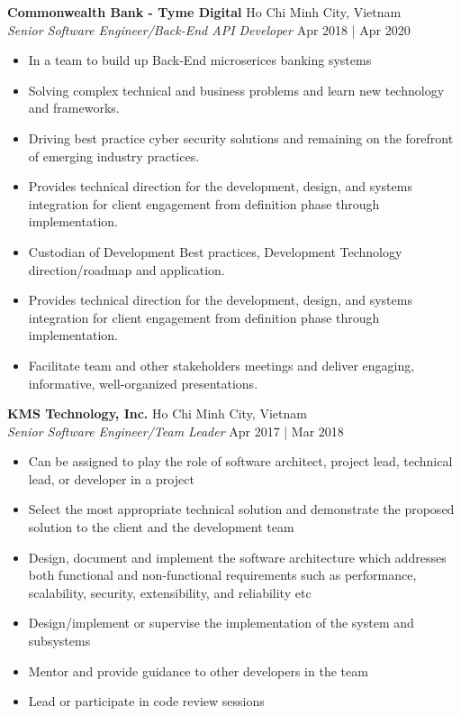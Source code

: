 \documentclass[a4paper]{article}
\begin{document}
\textbf{Commonwealth Bank - Tyme Digital} \hfill Ho Chi Minh City, Vietnam\\
\textit{Senior Software Engineer/Back-End API Developer} \hfill Apr 2018 | Apr 2020\\
\vspace{-1mm}
\begin{itemize} \itemsep 1pt
	\item In a team to build up Back-End microserices banking systems
	\item Solving complex technical and business problems and learn new technology and frameworks.
	\item Driving best practice cyber security solutions and remaining on the forefront of emerging industry practices.
	\item Provides technical direction for the development, design, and systems integration for client engagement from definition phase through implementation.
	\item Custodian of Development Best practices, Development Technology direction/roadmap and application.
	\item Provides technical direction for the development, design, and systems integration for client engagement from definition phase through implementation.
	\item Facilitate team and other stakeholders meetings and deliver engaging, informative, well-organized presentations.
\end{itemize}
\textbf{KMS Technology, Inc.} \hfill Ho Chi Minh City, Vietnam\\
\textit{Senior Software Engineer/Team Leader} \hfill Apr 2017 | Mar 2018\\
\vspace{-1mm}
\begin{itemize} \itemsep 1pt
	\item Can be assigned to play the role of software architect, project lead, technical lead, or developer in a project
	\item Select the most appropriate technical solution and demonstrate the proposed solution to the client and the development team
	\item Design, document and implement the software architecture which addresses both functional and non-functional requirements such as performance, scalability, security, extensibility, and reliability etc
	\item Design/implement or supervise the implementation of the system and subsystems
	\item Mentor and provide guidance to other developers in the team
	\item Lead or participate in code review sessions
\end{itemize}
\end{document}
